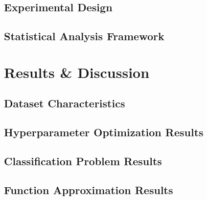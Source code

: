 \documentclass[10pt, conference]{IEEEtran}
\begin{document}
\subsection{Experimental Design}

\subsection{Statistical Analysis Framework}

\section{Results \& Discussion}
\subsection{Dataset Characteristics}

\subsection{Hyperparameter Optimization Results}

\subsection{Classification Problem Results}

\subsection{Function Approximation Results}
\end{document}

